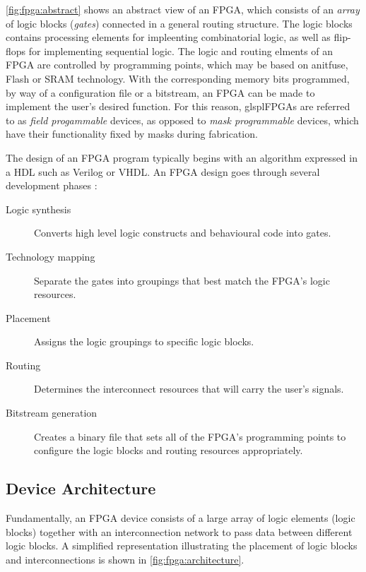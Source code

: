 \autoref{fig:fpga:abstract} shows an abstract view of an \gls{FPGA}, which
consists of an \emph{array} of logic blocks (\emph{gates}) connected in a
general routing structure. The logic blocks contains processing elements for
impleenting combinatorial logic, as well as flip-flops for implementing
sequential logic. The logic and routing elments of an \gls{FPGA} are controlled
by programming points, which may be based on anitfuse, Flash  or \gls{SRAM}
technology. With the corresponding memory bits programmed, by way of a
configuration file or a bitstream, an \gls{FPGA} can be made to implement the
user's desired function. For this reason, glspl{FPGAs} are referred to as
\emph{field progammable} devices, as opposed to \emph{mask programmable}
devices, which have their  functionality fixed by masks during fabrication.

The design of an \gls{FPGA} program typically begins with an algorithm expressed
in a \gls{HDL} such as Verilog or \gls{VHDL}. An \gls{FPGA} design goes through
several development phases \cite{Hauck:2007}:
\begin{description}
    \item[Logic synthesis] Converts high level logic constructs and behavioural
        code into gates.
    \item[Technology mapping] Separate the gates into groupings that best match
        the \gls{FPGA}'s logic resources.
    \item[Placement] Assigns the logic groupings to specific logic blocks.
    \item[Routing] Determines the interconnect resources that will carry the
        user's signals.
    \item[Bitstream generation] Creates a binary file that sets all of the
        \gls{FPGA}'s programming points to configure the logic blocks and
        routing resources appropriately.
\end{description}

\subsection{Device Architecture}
\label{fpga:architecture}
Fundamentally, an \gls{FPGA} device consists of a large array of logic elements
(logic blocks) together with an interconnection network to pass data between
different logic blocks. A simplified representation illustrating the placement
of logic blocks and interconnections is shown in
\autoref{fig:fpga:architecture}.

